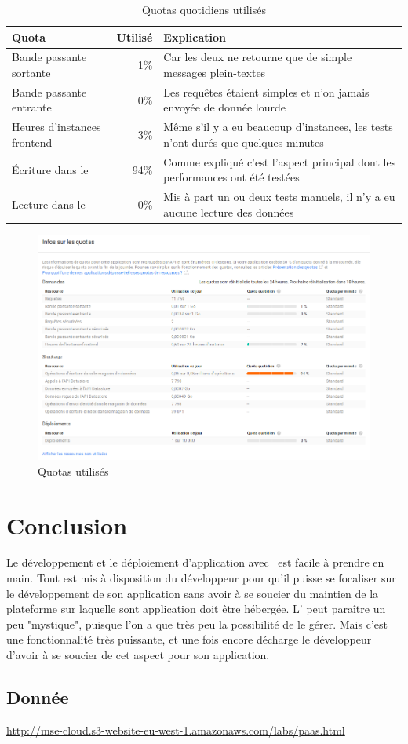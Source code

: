 \documentclass[french]{msereport}
\newcommand{\gae}{\brand{Google App Engine}}
\begin{document}
			\begin{table}
				\setlength\extrarowheight{3pt}
				\caption{Quotas quotidiens utilisés}
				\label{tab:quotas}
				\begin{tabularx}{\textwidth}{|l|r|X|}
					\hline
					\textbf{Quota}			& \textbf{Utilisé}	& \textbf{Explication} \\
					\hline
					Bande passante sortante				& 1\%	& Car les deux \eng{servlets} ne retourne que de simple messages plein-textes \\
					\hline
					Bande passante entrante 			& 0\%	& Les requêtes étaient simples et n'on jamais envoyée de donnée lourde \\
					\hline
					Heures d'instances frontend			& 3\%	& Même s'il y a eu beaucoup d'instances, les tests n'ont durés que quelques minutes \\
					\hline
					Écriture dans le \eng{datastore}	& 94\%	& Comme expliqué c'est l'aspect principal dont les performances ont été testées \\
					\hline
					Lecture dans le \eng{datastore}		& 0\%	& Mis à part un ou deux tests manuels, il n'y a eu aucune lecture des données \\
					\hline
				\end{tabularx}
			\end{table}
			
			\begin{figure}[h]
				\label{quotas}
				\centering
				\includegraphics[width=\textwidth]{screen_quotas.png}
				\caption{Quotas utilisés}
			\end{figure}
			
	\section{Conclusion}
		Le développement et le déploiement d'application avec \gae\ est facile à prendre en main. Tout est mis à disposition du développeur pour qu'il puisse se focaliser sur le développement de son application sans avoir à se soucier du maintien de la plateforme sur laquelle sont application doit être hébergée. L' peut paraître un peu "mystique", puisque l'on a que très peu la possibilité de le gérer. Mais c'est une fonctionnalité très puissante, et une fois encore décharge le développeur d'avoir à se soucier de cet aspect pour son application.

	\appendixsection
		
		\listoffigures
		
		\subsection{Donnée}
			\url{http://mse-cloud.s3-website-eu-west-1.amazonaws.com/labs/paas.html}
\end{document}
